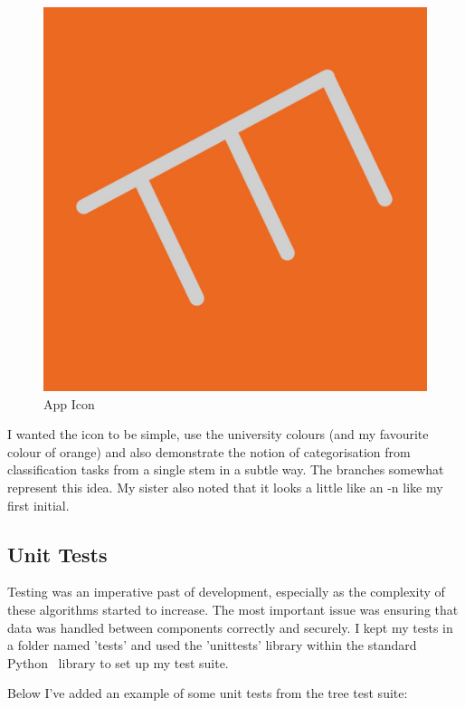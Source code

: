 \documentclass[letterpaper,10pt]{article}
\begin{document}
\begin{figure}[ht]
    \centering
    \includegraphics[width=1.0\textwidth]{icon.jpeg}
    \caption{App Icon}
    \label{icon}
\end{figure}

I wanted the icon to be simple, use the university colours (and my favourite colour of orange) and also demonstrate the notion of categorisation from classification tasks from a single stem in a subtle way. The branches somewhat represent this idea. My sister also noted that it looks a little like an -n like my first initial.\par

\subsection{Unit Tests}
Testing was an imperative past of development, especially as the complexity of these algorithms started to increase. The most important issue was ensuring that data was handled between components correctly and securely. I kept my tests in a folder named 'tests' and used the 'unittests' library within the standard Python~\cite{python3} library to set up my test suite. \par
Below I've added an example of some unit tests from the tree test suite:
\end{document}
